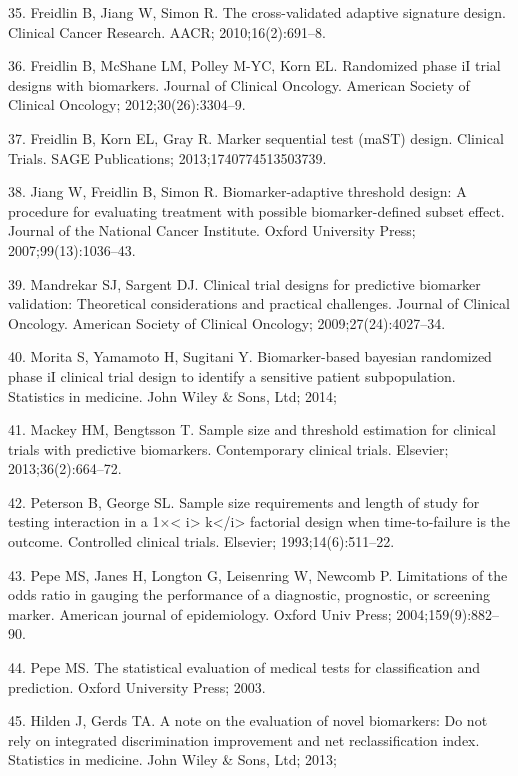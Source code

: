 \documentclass[11pt]{article}
\begin{document}
35. Freidlin B, Jiang W, Simon R. The cross-validated adaptive signature
design. Clinical Cancer Research. AACR; 2010;16(2):691--8.

36. Freidlin B, McShane LM, Polley M-YC, Korn EL. Randomized phase iI
trial designs with biomarkers. Journal of Clinical Oncology. American
Society of Clinical Oncology; 2012;30(26):3304--9.

37. Freidlin B, Korn EL, Gray R. Marker sequential test (maST) design.
Clinical Trials. SAGE Publications; 2013;1740774513503739.

38. Jiang W, Freidlin B, Simon R. Biomarker-adaptive threshold design: A
procedure for evaluating treatment with possible biomarker-defined
subset effect. Journal of the National Cancer Institute. Oxford
University Press; 2007;99(13):1036--43.

39. Mandrekar SJ, Sargent DJ. Clinical trial designs for predictive
biomarker validation: Theoretical considerations and practical
challenges. Journal of Clinical Oncology. American Society of Clinical
Oncology; 2009;27(24):4027--34.

40. Morita S, Yamamoto H, Sugitani Y. Biomarker-based bayesian
randomized phase iI clinical trial design to identify a sensitive
patient subpopulation. Statistics in medicine. John Wiley \& Sons, Ltd;
2014;

41. Mackey HM, Bengtsson T. Sample size and threshold estimation for
clinical trials with predictive biomarkers. Contemporary clinical
trials. Elsevier; 2013;36(2):664--72.

42. Peterson B, George SL. Sample size requirements and length of study
for testing interaction in a 1\(\times\)\textless{} i\textgreater{}
k\textless{}/i\textgreater{} factorial design when time-to-failure is
the outcome. Controlled clinical trials. Elsevier; 1993;14(6):511--22.

43. Pepe MS, Janes H, Longton G, Leisenring W, Newcomb P. Limitations of
the odds ratio in gauging the performance of a diagnostic, prognostic,
or screening marker. American journal of epidemiology. Oxford Univ
Press; 2004;159(9):882--90.

44. Pepe MS. The statistical evaluation of medical tests for
classification and prediction. Oxford University Press; 2003.

45. Hilden J, Gerds TA. A note on the evaluation of novel biomarkers: Do
not rely on integrated discrimination improvement and net
reclassification index. Statistics in medicine. John Wiley \& Sons, Ltd;
2013;
\end{document}
